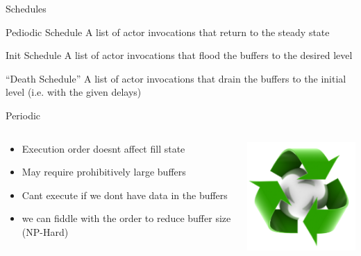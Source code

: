 \documentclass{beamer}
\begin{document}
\begin{frame}{Schedules}
\begin{block}{Pediodic Schedule}
A list of actor invocations that return to the steady state
\end{block}
\pause
\begin{block}{Init Schedule}
A list of actor invocations that flood the buffers to the desired level
\end{block}
\pause
\begin{block}{``Death Schedule''}
A list of actor invocations that drain the buffers to the initial level (i.e. with the given delays)
\end{block}
\end{frame}

\begin{frame}{Periodic}
\begin{columns}
\begin{column}{5cm}
\begin{itemize}
	\item Execution order doesnt affect fill state
	\item May require prohibitively large buffers
	\item Cant execute if we dont have data in the buffers
	\item we can fiddle with the order to reduce buffer size (NP-Hard)
\end{itemize}
\end{column}
\begin{column}{5cm}
\includegraphics[width=5cm]{../res/recycle.jpg}
\end{column}
\end{columns}
\end{frame}
\end{document}
